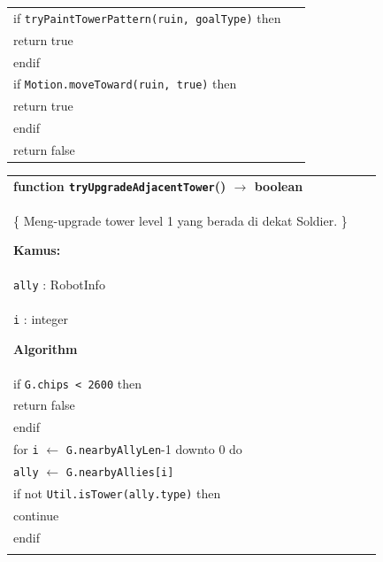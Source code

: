 \documentclass{article}
\newenvironment{pseudobox}
{
\centering
\begin{longtable}{|p{0.94\linewidth}|}
\hline
}
{
\\ \hline
\end{longtable}
\vspace{0.05cm}
}
\begin{document}
\begin{enumerate}[label=\alph*.]
\begin{enumerate}[label=\alph*.]
\begin{pseudobox}
\hspace*{1.5em}if \texttt{tryPaintTowerPattern(ruin, goalType)} then \\
\hspace*{3em}return true \\
\hspace*{1.5em}endif \\

\hspace*{1.5em}if \texttt{Motion.moveToward(ruin, true)} then \\
\hspace*{3em}return true \\
\hspace*{1.5em}endif \\

\hspace*{1.5em}return false
\end{pseudobox}

\begin{pseudobox}
\textbf{function \texttt{tryUpgradeAdjacentTower}() $\rightarrow$ boolean} \\
\{ Meng-upgrade tower level 1 yang berada di dekat Soldier. \}

\textbf{Kamus:} \\
\hspace*{1.5em}\texttt{ally} : RobotInfo \\
\hspace*{1.5em}\texttt{i} : integer

\textbf{Algorithm} \\
\hspace*{1.5em}if \texttt{G.chips < 2600} then \\
\hspace*{3em}return false \\
\hspace*{1.5em}endif \\

\hspace*{1.5em}for \texttt{i} $\leftarrow$ \texttt{G.nearbyAllyLen}-1 downto 0 do \\
\hspace*{3em}\texttt{ally} $\leftarrow$ \texttt{G.nearbyAllies[i]} \\

\hspace*{3em}if not \texttt{Util.isTower(ally.type)} then \\
\hspace*{4.5em}continue \\
\hspace*{3em}endif \\


\end{pseudobox}
\end{enumerate}
\end{enumerate}
\end{document}
